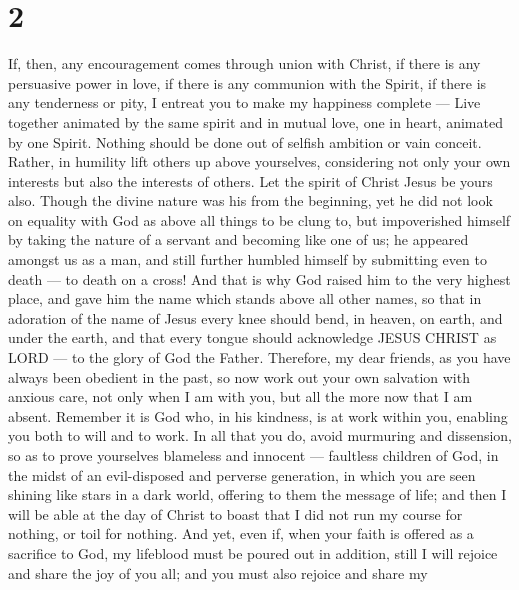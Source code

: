 \hypertarget{section-1}{%
\section{2}\label{section-1}}

 If, then, any encouragement comes through union with
Christ, if there is any persuasive power in love, if there is any
communion with the Spirit, if there is any tenderness or pity,
 I entreat you to make my happiness complete --- Live
together animated by the same spirit and in mutual love, one in heart,
animated by one Spirit.  Nothing should be done out of
selfish ambition or vain conceit. Rather, in humility lift others up
above yourselves,  considering not only your own interests
but also the interests of others.  Let the spirit of Christ
Jesus be yours also.  Though the divine nature was his from
the beginning, yet he did not look on equality with God as above all
things to be clung to,  but impoverished himself by taking
the nature of a servant and becoming like one of us;  he
appeared amongst us as a man, and still further humbled himself by
submitting even to death --- to death on a cross!  And that
is why God raised him to the very highest place, and gave him the name
which stands above all other names,  so that in adoration
of the name of Jesus every knee should bend, in heaven, on earth, and
under the earth,  and that every tongue should acknowledge
JESUS CHRIST as LORD --- to the glory of God the Father. 
Therefore, my dear friends, as you have always been obedient in the
past, so now work out your own salvation with anxious care, not only
when I am with you, but all the more now that I am absent. 
Remember it is God who, in his kindness, is at work within you, enabling
you both to will and to work.  In all that you do, avoid
murmuring and dissension,  so as to prove yourselves
blameless and innocent --- faultless children of God, in the midst of an
evil-disposed and perverse generation, in which you are seen shining
like stars in a dark world,  offering to them the message
of life; and then I will be able at the day of Christ to boast that I
did not run my course for nothing, or toil for nothing. 
And yet, even if, when your faith is offered as a sacrifice to God, my
lifeblood must be poured out in addition, still I will rejoice and share
the joy of you all;  and you must also rejoice and share my
